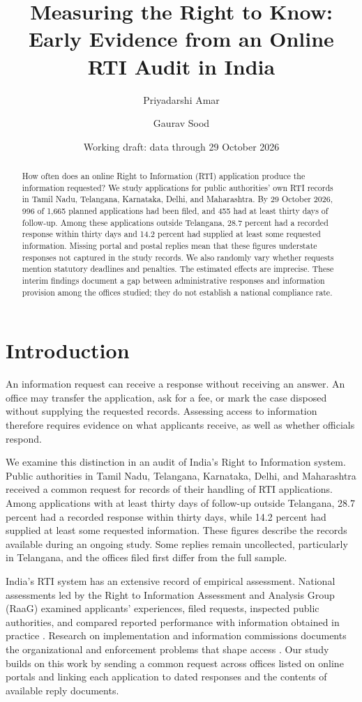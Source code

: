 \documentclass[11pt]{article}
\title{Measuring the Right to Know:\\Early Evidence from an Online RTI Audit in India}
\author{Priyadarshi Amar \and Gaurav Sood}
\date{Working draft: data through 29 October 2026}
\begin{document}
\maketitle
\begin{abstract}
How often does an online Right to Information (RTI) application produce the information requested? We study applications for public authorities' own RTI records in Tamil Nadu, Telangana, Karnataka, Delhi, and Maharashtra. By 29 October 2026, 996 of 1,665 planned applications had been filed, and 455 had at least thirty days of follow-up. Among these applications outside Telangana, 28.7 percent had a recorded response within thirty days and 14.2 percent had supplied at least some requested information. Missing portal and postal replies mean that these figures understate responses not captured in the study records. We also randomly vary whether requests mention statutory deadlines and penalties. The estimated effects are imprecise. These interim findings document a gap between administrative responses and information provision among the offices studied; they do not establish a national compliance rate.
\end{abstract}

\section{Introduction}
An information request can receive a response without receiving an answer. An office may transfer the application, ask for a fee, or mark the case disposed without supplying the requested records. Assessing access to information therefore requires evidence on what applicants receive, as well as whether officials respond.

We examine this distinction in an audit of India's Right to Information system. Public authorities in Tamil Nadu, Telangana, Karnataka, Delhi, and Maharashtra received a common request for records of their handling of RTI applications. Among applications with at least thirty days of follow-up outside Telangana, 28.7 percent had a recorded response within thirty days, while 14.2 percent had supplied at least some requested information. These figures describe the records available during an ongoing study. Some replies remain uncollected, particularly in Telangana, and the offices filed first differ from the full sample.

India's RTI system has an extensive record of empirical assessment. National assessments led by the Right to Information Assessment and Analysis Group (RaaG) examined applicants' experiences, filed requests, inspected public authorities, and compared reported performance with information obtained in practice \citep{raag2009,raag2014}. Research on implementation and information commissions documents the organizational and enforcement problems that shape access \citep{relly2020,sns2025}. Our study builds on this work by sending a common request across offices listed on online portals and linking each application to dated responses and the contents of available reply documents.
\end{document}
